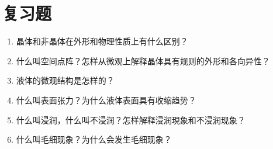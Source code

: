 \section*{复习题}

\begin{enumerate}
\item 晶体和非晶体在外形和物理性质上有什么区别？
\item 什么叫空间点阵？怎样从微观上解释晶体具有规则的外形和各向异性？
\item 液体的微观结构是怎样的？
\item 什么叫表面张力？为什么液体表面具有收缩趋势？
\item 什么叫浸润，什么叫不浸润？怎样解释浸润現象和不浸润现象？
\item 什么叫毛细现象？为什么会发生毛细现象？
\end{enumerate}



